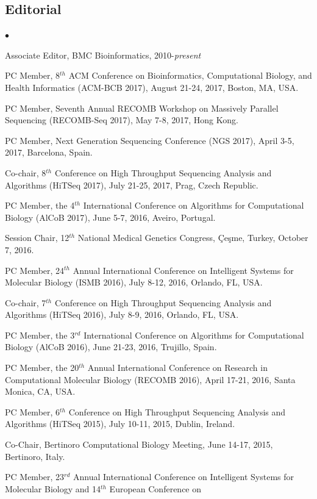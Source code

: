 \documentclass[margin,line]{res}
\newenvironment{list2}{
  \begin{list}{$\bullet$}{%
      \setlength{\itemsep}{0in}
      \setlength{\parsep}{0in} \setlength{\parskip}{0in}
      \setlength{\topsep}{0in} \setlength{\partopsep}{0in} 
      \setlength{\leftmargin}{0.2in}}}{\end{list}}
\begin{document}
\begin{resume}
\subsection{\small \sc Editorial}
\begin{list2}
\item
  Associate Editor, BMC Bioinformatics, 2010-{\it present}
\item
  PC Member,  8$^{th}$ ACM Conference on Bioinformatics, Computational Biology, and Health Informatics
  (ACM-BCB 2017), August 21-24, 2017, Boston, MA, USA.
\item
  PC Member,  Seventh Annual RECOMB Workshop on Massively Parallel Sequencing 
  (RECOMB-Seq 2017), May 7-8, 2017, Hong Kong.
\item
  PC Member,  Next Generation Sequencing Conference
  (NGS 2017), April 3-5, 2017, Barcelona, Spain.
\item
  Co-chair, 8$^{th}$ Conference on High Throughput Sequencing Analysis and Algorithms (HiTSeq 2017), July 21-25, 2017, Prag, Czech Republic.
\item
  PC Member, the 4$^{th}$ International Conference on Algorithms for Computational Biology (AlCoB 2017),
  June 5-7, 2016, Aveiro, Portugal.
\item
  Session Chair, 12$^{th}$ National Medical Genetics Congress, Çeşme, Turkey, October 7, 2016.
\item
  PC Member, 24$^{th}$ Annual International Conference on Intelligent Systems for Molecular Biology  (ISMB 2016), July 8-12, 2016, Orlando, FL, USA.
\item
  Co-chair, 7$^{th}$ Conference on High Throughput Sequencing Analysis and Algorithms (HiTSeq 2016), July 8-9, 2016, Orlando, FL, USA.
\item
  PC Member, the 3$^{rd}$ International Conference on Algorithms for Computational Biology (AlCoB 2016),
  June 21-23, 2016, Trujillo, Spain.
\item
  PC Member, the 20$^{th}$ Annual International Conference on Research in Computational Molecular Biology
  (RECOMB 2016), April 17-21, 2016, Santa Monica, CA, USA.
\clearpage
\item
  PC Member, 6$^{th}$ Conference on High Throughput Sequencing Analysis and Algorithms (HiTSeq 2015), July 10-11, 2015, Dublin, Ireland.
\item
  Co-Chair, Bertinoro Computational Biology Meeting, June 14-17, 2015, Bertinoro, Italy.
\item
  PC Member, 23$^{rd}$ Annual International Conference on Intelligent Systems for Molecular Biology and 14$^{th}$ European Conference on 

\end{list2}
\end{resume}
\end{document}
